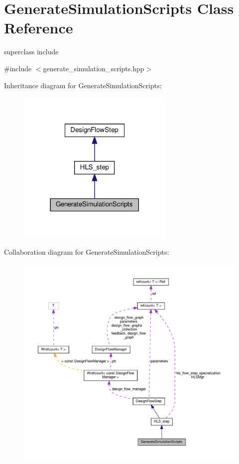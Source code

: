 \hypertarget{classGenerateSimulationScripts}{}\section{Generate\+Simulation\+Scripts Class Reference}
\label{classGenerateSimulationScripts}


superclass include  




{\ttfamily \#include $<$generate\+\_\+simulation\+\_\+scripts.\+hpp$>$}



Inheritance diagram for Generate\+Simulation\+Scripts\+:
\nopagebreak
\begin{figure}[H]
\begin{center}
\leavevmode
\includegraphics[width=213pt]{d7/d03/classGenerateSimulationScripts__inherit__graph}
\end{center}
\end{figure}


Collaboration diagram for Generate\+Simulation\+Scripts\+:
\nopagebreak
\begin{figure}[H]
\begin{center}
\leavevmode
\includegraphics[width=350pt]{d7/d5d/classGenerateSimulationScripts__coll__graph}
\end{center}
\end{figure}
